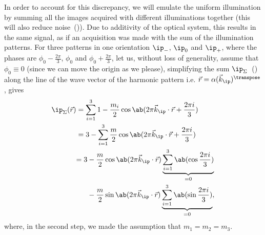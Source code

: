 In order to account for this discrepancy, we will emulate the uniform illumination by summing all the images acquired
    with different illuminations together (this will also reduce noise~()).
Due to additivity of the optical system, this results in the same signal, as if an acquisition was made with the sum
    of the illumination patterns.
    For three patterns in one orientation \(\ip_-\), \(\ip_0\) and \(\ip_+\), where the phases are \(\phi_0
    - \tfrac{2\pi}{3}\), \(\phi_0\)
    and \(\phi_0 + \tfrac{2\pi}{3}\), let us, without loss of generality, assume that \(\phi_0 \equiv 0\) (since we can move the 
    origin as we please), simplifying the sum \(\ip_\Sigma\)~() along the line of the wave 
    vector of the harmonic pattern i.e. \(\vec{r} = \alpha(\vec{k}_\ip)^{\transpose}\), gives %
    \begin{equation*}
        \begin{split}
            \ip_\Sigma (\vec{r}) &= \sum_{i=1}^3 1 - \frac{m_i}{2} \cos\ab(2\pi \vec{k}_\ip \cdot \vec{r} 
                + \frac{2\pi i}{3}) \\
                               &= 3 - \sum_{i=1}^3 \frac{m}{2} \cos\ab(2\pi \vec{k}_\ip \cdot \vec{r} + 
                                \frac{2\pi i}{3}) \\
                               &\begin{split}
                                   = 3 &-\frac{m}{2} \cos\ab(2\pi \vec{k}_\ip \cdot \vec{r})
                                    \underbrace{\sum_{i=1}^3\ab(\cos\frac{2\pi i}{3})}_{=0} \\
                                       &- \frac{m}{2} \sin\ab(2\pi  \vec{k}_\ip \cdot \vec{r})
                                    \underbrace{\sum_{i=1}^3\ab(\sin\frac{2\pi i}{3})}_{=0},
                                \end{split}
        \end{split}
    \end{equation*}
    where, in the second step, we made the assumption that \(m_1 = m_2 = m_3\).

\begin{marginfigure}[*-16]
\caption{Sum of the illumination pattern intensity along the wave vector for the first orientation, results in a uniform 
    intensity.}
\end{marginfigure}

